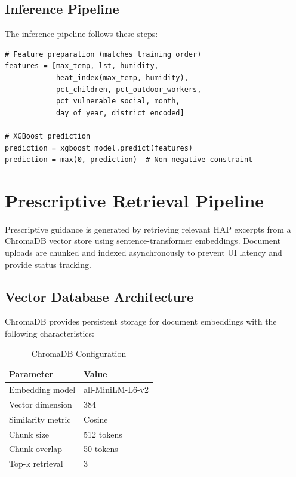 \documentclass[conference]{IEEEtran}
\begin{document}
\subsection{Inference Pipeline}
The inference pipeline follows these steps:

\begin{lstlisting}[caption={Inference pipeline used by the predictive engine.}, label={lst:predictive}]
# Feature preparation (matches training order)
features = [max_temp, lst, humidity,
            heat_index(max_temp, humidity),
            pct_children, pct_outdoor_workers,
            pct_vulnerable_social, month, 
            day_of_year, district_encoded]

# XGBoost prediction
prediction = xgboost_model.predict(features)
prediction = max(0, prediction)  # Non-negative constraint
\end{lstlisting}

\section{Prescriptive Retrieval Pipeline}
\label{sec:prescriptive}

Prescriptive guidance is generated by retrieving relevant HAP excerpts from a ChromaDB vector store using sentence-transformer embeddings. Document uploads are chunked and indexed asynchronously to prevent UI latency and provide status tracking.

\subsection{Vector Database Architecture}
ChromaDB provides persistent storage for document embeddings with the following characteristics:

\begin{table}[htbp]
\centering
\caption{ChromaDB Configuration}
\begin{tabular}{@{}ll@{}}
\toprule
\textbf{Parameter} & \textbf{Value} \\
\midrule
Embedding model & all-MiniLM-L6-v2 \\
Vector dimension & 384 \\
Similarity metric & Cosine \\
Chunk size & 512 tokens \\
Chunk overlap & 50 tokens \\
Top-k retrieval & 3 \\
\bottomrule
\end{tabular}
\label{tab:chromadb}
\end{table}
\end{document}
